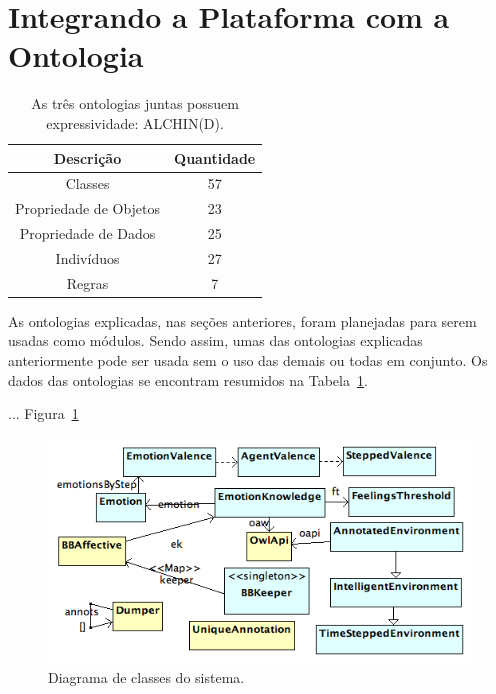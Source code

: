 
\section{Integrando a Plataforma \jason com a Ontologia}

\begin{table}[b]
	\caption{As três ontologias juntas possuem expressividade: ALCHIN(D).}
	\label{tab:tp:cdu:geral}
	\begin{center}
	\begin{tabular}{|c|c|}
		\hline
		Descrição & Quantidade \\ \hline
		Classes &  57 		\\ \hline
		Propriedade de Objetos & 23 \\ \hline
		Propriedade de Dados & 25 \\ \hline
		Indivíduos &  27	\\ \hline
		Regras & 7 \\ \hline
	\end{tabular}
	\end{center}
\end{table}

As ontologias explicadas, nas seções anteriores, foram planejadas para serem
usadas como módulos. Sendo assim, umas das ontologias explicadas anteriormente
pode ser usada sem o uso das demais ou todas em conjunto. Os dados das
ontologias se encontram resumidos na Tabela~\ref{tab:tp:cdu:geral}.

...
Figura~\ref{fig:dcs}


\begin{figure}
  \centering
  \includegraphics[width=14cm]{figuras/implementacao-15dez2011.png}
  \caption{Diagrama de classes do sistema.}
  \label{fig:dcs}
\end{figure}

